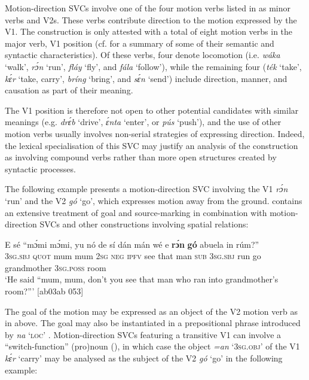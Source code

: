 Motion-direction SVCs involve one of the four motion{\fff} verbs listed in  as minor verbs and V2s. These verbs contribute direction to the motion expressed by the V1. The construction is only attested with a total of eight motion verbs in the major verb, V1 position (cf.  for a summary of some of their semantic and syntactic characteristics). Of these verbs, four denote locomotion (i.e. \textit{wáka} ‘walk’, \textit{rɔ́n} ‘run’, \textit{fláy} ‘fly’, and \textit{fála} ‘follow’), while the remaining four (\textit{ték} ‘take’, \textit{kɛ́r} ‘take, carry’, \textit{bríng} ‘bring’, and \textit{sɛ́n} ‘send’) include direction, manner, and causation as part of their meaning. 


The V1 position is therefore not open to other potential candidates with similar meanings (e.g. \textit{drɛ́b} ‘drive’, \textit{ɛ́nta} ‘enter’, or \textit{pús} ‘push’), and the use of other motion verbs usually involves non-serial strategies of expressing direction. Indeed, the lexical specialisation of this SVC may justify an analysis of the construction as involving compound verbs {\fff}rather than more open structures created by syntactic processes. 



The following example presents a motion-direction SVC involving the V1 \textit{rɔ́n} ‘run’ and the V2 \textit{gó} ‘go’, which expresses motion away from the ground.  contains an extensive treatment of goal and source-marking in combination with motion-direction SVCs and other constructions involving spatial relations:



\ea%
    \label{ex:key:1543}
    \gll E    sé    “mɔ́mi  mɔ́mi,  yu  nó  de  sí  dán  mán    wé  e
\textbf{rɔ́n}    \textbf{gó}  abuela    in    rúm?”\\
\textsc{3sg.sbj}  \textsc{quot}     mum  mum  \textsc{2sg}  \textsc{neg}  \textsc{ipfv}  see  that  man    \textsc{sub}  \textsc{3sg.sbj}
run    go  grandmother  \textsc{3sg.poss}  room\\

\glt ‘He said “mum, mum, don’t you see that man who ran into 
grandmother’s room?”’ [ab03ab 053]
\z

The goal of the motion may be expressed as an object of the V2 motion verb as in  above. The goal may also be instantiated in a prepositional phrase introduced by \textit{na} ‘\textsc{loc}’ . Motion{\fff}-direction SVCs featuring a transitive V1 can involve a “switch-function{\fff}” (pro)noun (\citealt[14–15]{Aikhenvald2006}), in which case the object \textit{=an} ‘\textsc{3sg.obj}’ of the V1 \textit{kɛ́r} ‘carry’ may be analysed as the subject{\fff} of the V2 \textit{gó} ‘go’ in the following example:


